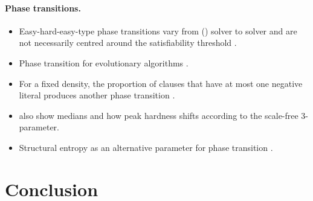 \documentclass{article}
\theoremstyle{definition}
\theoremstyle{remark}
\begin{document}
\paragraph{Phase transitions.}
\begin{itemize}
\item Easy-hard-easy-type phase transitions vary from (\SAT{}) solver to solver
  and are not necessarily centred around the satisfiability threshold
  \cite{DBLP:journals/constraints/CoarfaDASV03}.
\item Phase transition for evolutionary algorithms
  \cite{DBLP:journals/algorithmica/DoerrNS17}.
\item For a fixed density, the proportion of clauses that have at most one
  negative literal produces another phase transition
  \cite{DBLP:journals/amai/MaarenN05}.
\item \cite{DBLP:conf/tacas/BlasiusFS19} also show medians and how peak hardness
  shifts according to the scale-free 3-\SAT{} parameter.
\item Structural entropy as an alternative parameter for phase transition
  \cite{DBLP:journals/access/LinWN21}.
\end{itemize}

\section{Conclusion}
\end{document}
